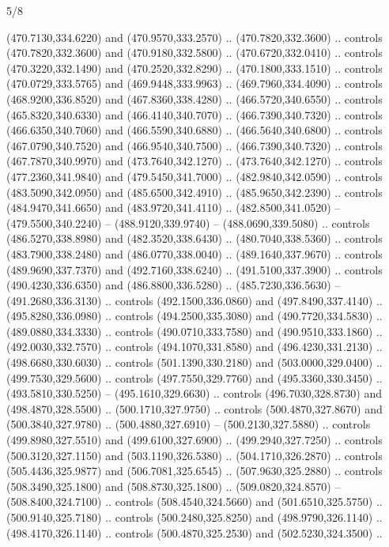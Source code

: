 \begin{flagdescription}{5/8}
\begin{scope}[xshift=0.5\flaglength,yshift=0.5\flagwidth,scale=\flagwidth/475.63]
\begin{scope}[y=0.8pt, x=0.8pt, yscale=-1, xscale=1,shift={(-450,-300)}]
\begin{scope}[cm={{1.0,0.0,0.0,1.0,(-0.0002,0.12556)}},cm={{1.0,0.0,0.0,1.0,(0.00179,0.0)}}]
  (470.7130,334.6220) and (470.9570,333.2570) .. (470.7820,332.3600) .. controls
  (470.7820,332.3600) and (470.9180,332.5800) .. (470.6720,332.0410) .. controls
  (470.3220,332.1490) and (470.2520,332.8290) .. (470.1800,333.1510) .. controls
  (470.0729,333.5765) and (469.9448,333.9963) .. (469.7960,334.4090) .. controls
  (468.9200,336.8520) and (467.8360,338.4280) .. (466.5720,340.6550) .. controls
  (465.8320,340.6330) and (466.4140,340.7070) .. (466.7390,340.7320) .. controls
  (466.6350,340.7060) and (466.5590,340.6880) .. (466.5640,340.6800) .. controls
  (467.0790,340.7520) and (466.9540,340.7500) .. (466.7390,340.7320) .. controls
  (467.7870,340.9970) and (473.7640,342.1270) .. (473.7640,342.1270) .. controls
  (477.2360,341.9840) and (479.5450,341.7000) .. (482.9840,342.0590) .. controls
  (483.5090,342.0950) and (485.6500,342.4910) .. (485.9650,342.2390) .. controls
  (484.9470,341.6650) and (483.9720,341.4110) .. (482.8500,341.0520) --
  (479.5500,340.2240) -- (488.9120,339.9740) -- (488.0690,339.5080) .. controls
  (486.5270,338.8980) and (482.3520,338.6430) .. (480.7040,338.5360) .. controls
  (483.7900,338.2480) and (486.0770,338.0040) .. (489.1640,337.9670) .. controls
  (489.9690,337.7370) and (492.7160,338.6240) .. (491.5100,337.3900) .. controls
  (490.4230,336.6350) and (486.8800,336.5280) .. (485.7230,336.5630) --
  (491.2680,336.3130) .. controls (492.1500,336.0860) and (497.8490,337.4140) ..
  (495.8280,336.0980) .. controls (494.2500,335.3080) and (490.7720,334.5830) ..
  (489.0880,334.3330) .. controls (490.0710,333.7580) and (490.9510,333.1860) ..
  (492.0030,332.7570) .. controls (494.1070,331.8580) and (496.4230,331.2130) ..
  (498.6680,330.6030) .. controls (501.1390,330.2180) and (503.0000,329.0400) ..
  (499.7530,329.5600) .. controls (497.7550,329.7760) and (495.3360,330.3450) ..
  (493.5810,330.5250) -- (495.1610,329.6630) .. controls (496.7030,328.8730) and
  (498.4870,328.5500) .. (500.1710,327.9750) .. controls (500.4870,327.8670) and
  (500.3840,327.9780) .. (500.4880,327.6910) -- (500.2130,327.5880) .. controls
  (499.8980,327.5510) and (499.6100,327.6900) .. (499.2940,327.7250) .. controls
  (500.3120,327.1150) and (503.1190,326.5380) .. (504.1710,326.2870) .. controls
  (505.4436,325.9877) and (506.7081,325.6545) .. (507.9630,325.2880) .. controls
  (508.3490,325.1800) and (508.8730,325.1800) .. (509.0820,324.8570) --
  (508.8400,324.7100) .. controls (508.4540,324.5660) and (501.6510,325.5750) ..
  (500.9140,325.7180) .. controls (500.2480,325.8250) and (498.9790,326.1140) ..
  (498.4170,326.1140) .. controls (500.4870,325.2530) and (502.5230,324.3500) ..

\end{scope}
\end{scope}
\end{scope}
\end{flagdescription}
